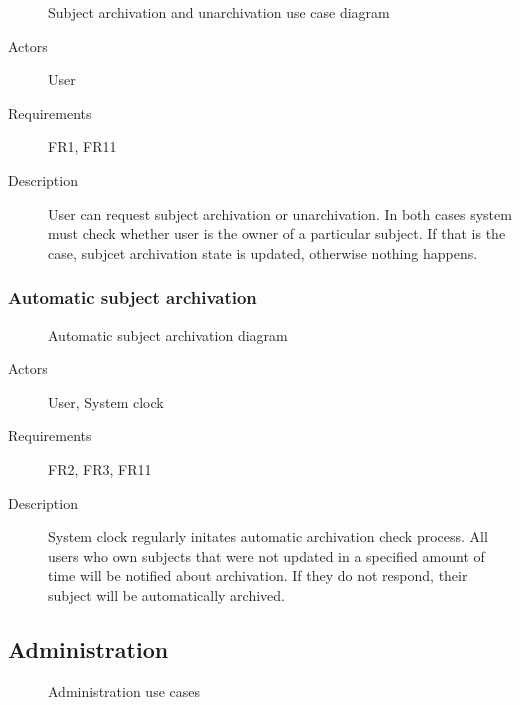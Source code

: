 \documentclass[
    english, %
]{VUMIFPSkursinis}
\begin{document}
\begin{figure}[ht]
    \centering
    
    \label{archivation-use-case}
    \caption{Subject archivation and unarchivation use case diagram}
\end{figure}

\begin{description}
    \item[Actors] User
    \item[Requirements] FR1, FR11
    \item[Description] User can request subject archivation or unarchivation. In both cases system must check whether user is the owner of a particular subject. If that is the case, subjcet archivation state is updated, otherwise nothing happens.
\end{description}

\subsubsection{Automatic subject archivation}

\begin{figure}[ht]
    \centering
    
    \label{automatic-archivation-use-case}
    \caption{Automatic subject archivation diagram}
\end{figure}

\begin{description}
    \item[Actors] User, System clock
    \item[Requirements] FR2, FR3, FR11
    \item[Description] System clock regularly initates automatic archivation check process. All users who own subjects that were not updated in a specified amount of time will be notified about archivation. If they do not respond, their subject will be automatically archived.
\end{description}

\subsection{Administration}

\begin{figure}[ht]
    \centering
    
    \label{administration-use-cases}
    \caption{Administration use cases}
\end{figure}
\end{document}
